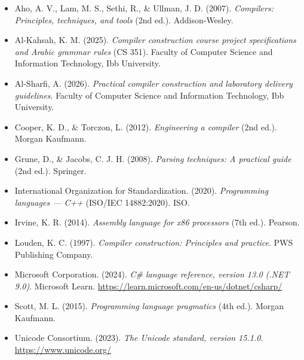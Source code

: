 \documentclass[11pt,a4paper,oneside]{report}
\begin{document}
\begin{itemize}
    \item Aho, A. V., Lam, M. S., Sethi, R., \& Ullman, J. D. (2007). \textit{Compilers: Principles, techniques, and tools} (2nd ed.). Addison-Wesley.
    \item Al-Kahsah, K. M. (2025). \textit{Compiler construction course project specifications and Arabic grammar rules} (CS 351). Faculty of Computer Science and Information Technology, Ibb University.
    \item Al-Sharfi, A. (2026). \textit{Practical compiler construction and laboratory delivery guidelines}. Faculty of Computer Science and Information Technology, Ibb University.
    \item Cooper, K. D., \& Torczon, L. (2012). \textit{Engineering a compiler} (2nd ed.). Morgan Kaufmann.
    \item Grune, D., \& Jacobs, C. J. H. (2008). \textit{Parsing techniques: A practical guide} (2nd ed.). Springer.
    \item International Organization for Standardization. (2020). \textit{Programming languages --- C++} (ISO/IEC 14882:2020). ISO.
    \item Irvine, K. R. (2014). \textit{Assembly language for x86 processors} (7th ed.). Pearson.
    \item Louden, K. C. (1997). \textit{Compiler construction: Principles and practice}. PWS Publishing Company.
    \item Microsoft Corporation. (2024). \textit{C\# language reference, version 13.0 (.NET 9.0)}. Microsoft Learn. \url{https://learn.microsoft.com/en-us/dotnet/csharp/}
    \item Scott, M. L. (2015). \textit{Programming language pragmatics} (4th ed.). Morgan Kaufmann.
    \item Unicode Consortium. (2023). \textit{The Unicode standard, version 15.1.0}. \url{https://www.unicode.org/}
\end{itemize}
\end{document}
